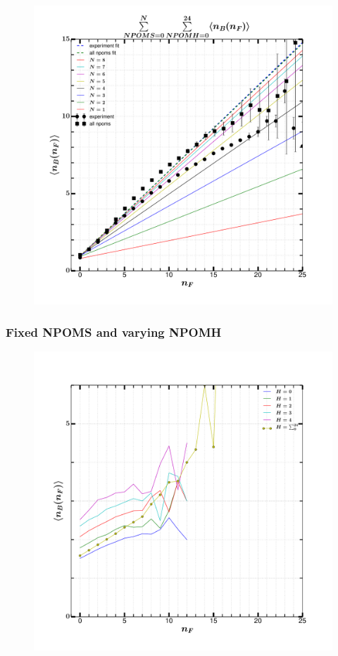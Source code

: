 \documentclass[]{article}
\begin{document}
\begin{figure}[h!]
\centering
\includegraphics[scale=0.5]{../analyzed/nbnf_Nnpoms_allnpomh.pdf}
    \label{fig1}
    \caption[N NPOMS and all NPOMH]{}
\end{figure}

\newpage
\subsubsection*{\centering Fixed NPOMS and varying NPOMH}

\begin{figure}[h!]
    \centering
    \includegraphics[scale=0.5]{../analyzed/nbnf_fixed_s_var_h.pdf}
    \caption[Fixed NPOMS and varying NPOMH]{}
\end{figure}
\end{document}

